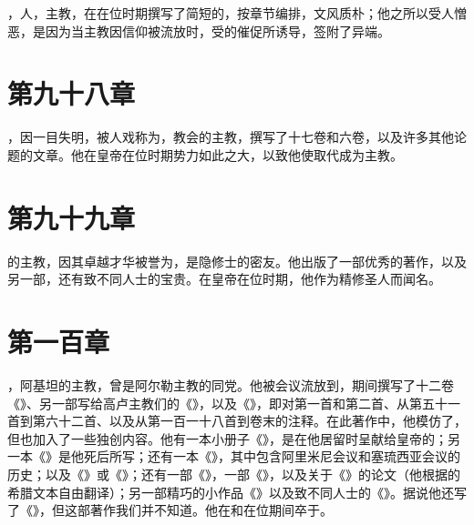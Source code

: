 ，人，主教，在在位时期撰写了简短的，按章节编排，文风质朴；他之所以受人憎恶，是因为当主教因信仰被流放时，受的催促所诱导，签附了异端。\par


\section{第九十八章}

，因一目失明，被人戏称为，教会的主教，撰写了十七卷和六卷，以及许多其他论题的文章。他在皇帝在位时期势力如此之大，以致他使取代成为主教。\par


\section{第九十九章}

的主教，因其卓越才华被誉为，是隐修士的密友。他出版了一部优秀的著作，以及另一部，还有致不同人士的宝贵。在皇帝在位时期，他作为精修圣人而闻名。\par


\section{第一百章}

，阿基坦的主教，曾是阿尔勒主教的同党。他被会议流放到，期间撰写了十二卷《》、另一部写给高卢主教们的《》，以及《》，即对第一首和第二首、从第五十一首到第六十二首、以及从第一百一十八首到卷末的注释。在此著作中，他模仿了，但也加入了一些独创内容。他有一本小册子《》，是在他居留时呈献给皇帝的；另一本《》是他死后所写；还有一本《》，其中包含阿里米尼会议和塞琉西亚会议的历史；以及《》或《》；还有一部《》，一部《》，以及关于《》的论文（他根据的希腊文本自由翻译）；另一部精巧的小作品《》以及致不同人士的《》。据说他还写了《》，但这部著作我们并不知道。他在和在位期间卒于。\par

